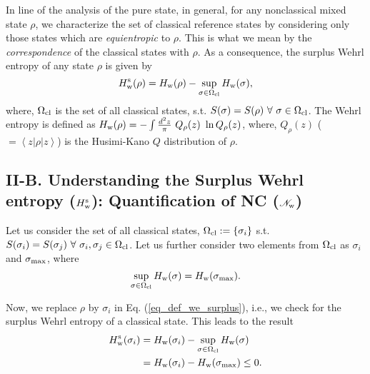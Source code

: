 \documentclass[letter,scriptaddress,twocolumn,prl,showkeys]{revtex4}
\newcommand{\ket}[1]{\left| #1 \right\rangle}
\newcommand{\bra}[1]{\left\langle #1 \right|}
\begin{document}
In line of the analysis of the pure state, in general, for any nonclassical mixed state $\rho$, we characterize the set of classical reference states by considering only those states which are {\em equientropic} to $\rho$. 
This is what we mean by the {\em correspondence} of the classical states with $\rho$. 
As a consequence, the surplus Wehrl entropy of any state $\rho$ is given by
\begin{equation}
H_{\rm{w}}^{\rm{s}}(\rho)=H_{\rm{w}}(\rho)-\sup_{\sigma\in\Omega_{\rm{cl}}}H_{\rm{w}}(\sigma),
\label{eq_def_we_surplus}
\end{equation}
where, $\Omega_{\rm{cl}}$ is the set of all classical states, s.t. $S(\sigma) = S(\rho)~ \forall~\sigma\in \Omega_{\rm{cl}}$. 
The Wehrl entropy is defined as $H_{\rm{w}}(\rho)=-\int\frac{d^{2}z}{\pi}~Q_{\rho}(z)~ \ln Q_{\rho}(z)$, where, $Q_{\rho}(z)$ ($= \bra z\rho\ket z$) is the Husimi-Kano $Q$ distribution of $\rho$. 

\subsection*{II-B. Understanding the Surplus Wehrl entropy ($H_{\rm{w}}^{\rm{s}}$): Quantification of NC ($\mathscr{N}_{\rm{w}}$)}

Let us consider the set of all classical states, $\Omega_{\rm{cl}}:= \lbrace\sigma_{i}\rbrace$ s.t. $S(\sigma_{i}) = S(\sigma_{j})~\forall~\sigma_{i},\sigma_{j}\in\Omega_{\rm{cl}}$. 
Let us further consider two elements from $\Omega_{\rm{cl}}$ as $\sigma_{i}$ and $\sigma_{\rm{max}}$, where
\begin{equation}
\sup_{\sigma\in\Omega_{\rm{cl}}} H_{\rm{w}}(\sigma) = H_{\rm{w}}(\sigma_{\rm{max}}).
\end{equation} 

Now, we replace $\rho$ by $\sigma_{i}$ in Eq. (\ref{eq_def_we_surplus}), i.e., we check for the surplus Wehrl entropy of a classical state. 
This leads to the result
\begin{align}
H_{\rm{w}}^{\rm{s}}(\sigma_{i})&=H_{\rm{w}}(\sigma_{i})-\sup_{\sigma\in\Omega_{\rm{cl}}}H_{\rm{w}}(\sigma) \nonumber \\
&=H_{\rm{w}}(\sigma_{i})-H_{\rm{w}}(\sigma_{\rm{max}})\leq 0.
\end{align}
\end{document}
